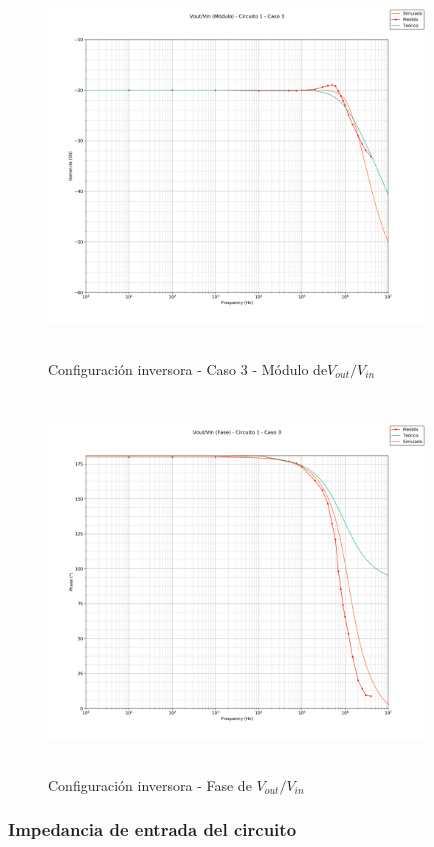 \begin{figure}[H] %
	\centering
	\includegraphics[width=10cm,height=10cm,keepaspectratio]{../EJ1/00GRAFICOS/c1c3/c1c3voviMod.png}
	\caption{Configuración inversora - Caso 3 - M\'odulo de$V_{out}/V_{in}$}	
	\label{c1c3voviM}
\end{figure}

\begin{figure}[H] %
	\centering
	\includegraphics[width=10cm,height=10cm,keepaspectratio]{../EJ1/00GRAFICOS/c1c3/c1c3voviFASE.png}
	\caption{Configuración inversora - Fase de $V_{out}/V_{in}$}
	\label{c1c3voviP}
\end{figure}

\subsubsection{Impedancia de entrada del circuito} %


